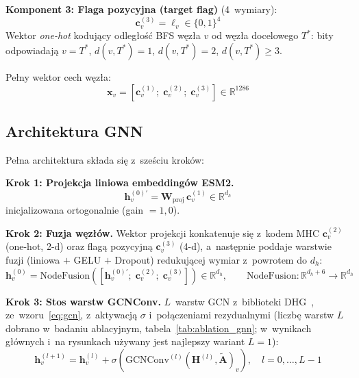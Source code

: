 \documentclass{SGGW-thesis}
\begin{document}
\textbf{Komponent 3: Flaga pozycyjna (target flag)} (4~wymiary):
\begin{equation}
    \mathbf{c}_v^{(3)} = \boldsymbol{\ell}_v \in \{0,1\}^4
    \label{eq:gnn_feat3}
\end{equation}
Wektor \textit{one-hot} kodujący odległość BFS węzła $v$ od węzła docelowego $T^*$: bity odpowiadają
$v = T^*$, $d(v,T^*)=1$, $d(v,T^*)=2$, $d(v,T^*)\geq 3$.

Pełny wektor cech węzła:
\begin{equation}
    \mathbf{x}_v = \left[\mathbf{c}_v^{(1)};\; \mathbf{c}_v^{(2)};\; \mathbf{c}_v^{(3)}\right] \in \mathbb{R}^{1286}
    \label{eq:gnn_node_feat}
\end{equation}

\subsection{Architektura GNN}

Pełna architektura składa się z~sześciu kroków:

\textbf{Krok 1: Projekcja liniowa embeddingów ESM2.}
\begin{equation}
    \mathbf{h}_v^{(0)\prime} = \mathbf{W}_{\mathrm{proj}}\, \mathbf{c}_v^{(1)} \in \mathbb{R}^{d_h}
    \label{eq:gnn_proj}
\end{equation}
inicjalizowana ortogonalnie (gain $= 1{,}0$).

\textbf{Krok 2: Fuzja węzłów.} Wektor projekcji konkatenuje się z~kodem MHC $\mathbf{c}_v^{(2)}$
(one-hot, 2-d) oraz flagą pozycyjną $\mathbf{c}_v^{(3)}$ (4-d), a~następnie poddaje warstwie fuzji
(liniowa $+$ GELU $+$ Dropout) redukującej wymiar z~powrotem do $d_h$:
\begin{equation}
    \mathbf{h}_v^{(0)} = \mathrm{NodeFusion}\!\left(\left[\mathbf{h}_v^{(0)\prime};\; \mathbf{c}_v^{(2)};\; \mathbf{c}_v^{(3)}\right]\right) \in \mathbb{R}^{d_h}, \qquad \mathrm{NodeFusion} : \mathbb{R}^{d_h + 6} \to \mathbb{R}^{d_h}
    \label{eq:gnn_fusion}
\end{equation}

\textbf{Krok 3: Stos warstw GCNConv.} $L$~warstw GCN z~biblioteki DHG~\cite{feng2019}, ze~wzoru~\eqref{eq:gcn},
z~aktywacją $\sigma$ i~połączeniami rezydualnymi (liczbę warstw $L$ dobrano w~badaniu ablacyjnym,
tabela~\ref{tab:ablation_gnn}; w~wynikach głównych i~na rysunkach używany jest najlepszy wariant $L=1$):
\begin{equation}
    \mathbf{h}_v^{(l+1)} = \mathbf{h}_v^{(l)} + \sigma\!\left(\mathrm{GCNConv}^{(l)}\!\left(\mathbf{H}^{(l)}, \tilde{\mathbf{A}}\right)_v\right), \quad l = 0,\ldots,L-1
    \label{eq:gnn_gcn}
\end{equation}
\end{document}
